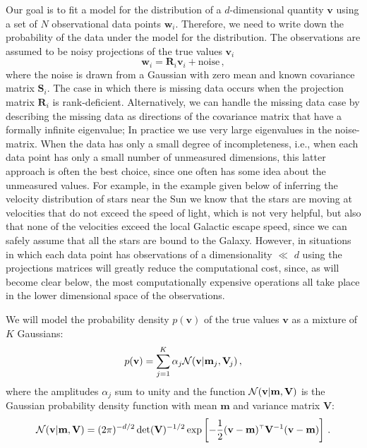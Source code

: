 \documentclass[aoas,preprint,authoryear,round]{imsart}
\newcommand{\ie}{i.e.}
\newcommand{\normal}{{\cal N}}
\renewcommand{\vec}[1]{\mathbf{#1}} %
\newcommand{\mm}{\vec{m}}
\newcommand{\vv}{\vec{v}}
\newcommand{\ww}{\vec{w}}
\newcommand{\mmj}{\mm_j}
\newcommand{\vvi}{\vv_i}
\newcommand{\wwi}{\ww_i}
\newcommand{\ten}[1]{\mathbf{#1}} %
\newcommand{\RR}{\ten{R}}
\renewcommand{\SS}{\ten{S}}
\newcommand{\VV}{\ten{V}}
\newcommand{\RRi}{\RR_i}
\newcommand{\SSi}{\SS_i}
\newcommand{\VVj}{\VV_{\!j}} %
\newcommand{\T}{^{\scriptscriptstyle \top}}   %
\newcommand{\alphaj}{\alpha_j}
\begin{document}
Our goal is to fit a model for the distribution of a $d$-dimensional
quantity $\vv$ using a set of $N$ observational data points
$\wwi$. Therefore, we need to write down the probability of the data
under the model for the distribution. The observations are assumed to
be noisy projections of the true values $\vvi$
\begin{equation}\label{eq:obs}
\wwi = \RRi \vvi + \mbox{noise}\, ,
\end{equation}
where the noise is drawn from a Gaussian with zero mean and known
covariance matrix $\SSi$. The case in which there is missing data
occurs when the projection matrix $\RRi$ is
rank-deficient. Alternatively, we can handle the missing data case by
describing the missing data as directions of the covariance matrix
that have a formally infinite eigenvalue; In practice we use very
large eigenvalues in the noise-matrix. When the data has only a small
degree of incompleteness, \ie, when each data point has only a small
number of unmeasured dimensions, this latter approach is often the
best choice, since one often has some idea about the unmeasured
values. For example, in the example given below of inferring the
velocity distribution of stars near the Sun we know that the stars are
moving at velocities that do not exceed the speed of light, which is
not very helpful, but also that none of the velocities exceed the
local Galactic escape speed, since we can safely assume that all the
stars are bound to the Galaxy. However, in situations in which each
data point has observations of a dimensionality $\ll$ $d$ using the
projections matrices will greatly reduce the computational cost,
since, as will become clear below, the most computationally expensive
operations all take place in the lower dimensional space of the
observations.

We will model the probability density $p(\vv)$ of the true values $\vv$ as a
mixture of $K$ Gaussians:
\begin{equation}
p(\vv) = \sum_{j=1}^K \alphaj \normal(\vv|\mmj,\VVj)\, ,
\end{equation}
where the amplitudes $\alphaj$ sum to unity and the function
$\normal(\vv|\mm,\VV)$ is the Gaussian probability density function
with mean $\mm$ and variance matrix $\VV$:
\begin{equation}
\normal(\vv|\mm,\VV) = (2\pi)^{-d/2} \det(\VV)^{-1/2} \exp\left[-\frac{1}{2}(\vv-\mm)\T\VV^{-1}(\vv-\mm)\right]\, .
\end{equation}
\end{document}
